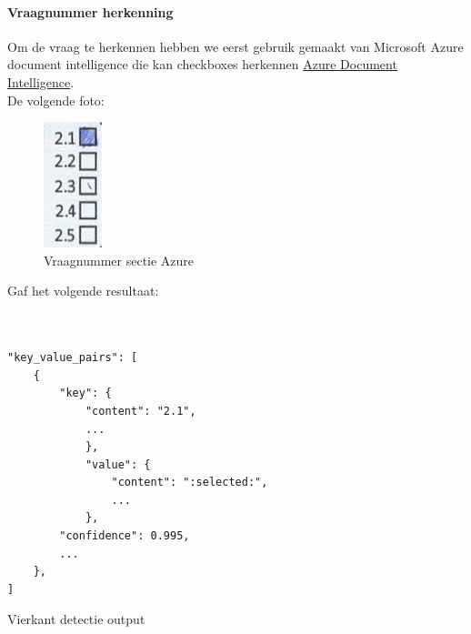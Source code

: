 \documentclass[12pt]{article}
\begin{document}
\begin{multicols}{2}
\paragraph*{Vraagnummer herkenning} Om de vraag te herkennen hebben we eerst gebruik gemaakt van Microsoft Azure document intelligence die kan checkboxes herkennen \href{https://azure.microsoft.com/en-us/products/ai-services/ai-document-intelligence}{Azure Document Intelligence}.\\
De volgende foto:
\begin{figure}[H]
    \centering
    \includegraphics[width=0.2\linewidth]{./images/methoden/inscannen/sectie/checkbox/vraagnummer/answer_section.png}
    \caption{Vraagnummer sectie Azure}
    \label{fig:sec-azure}
\end{figure}
\noindent Gaf het volgende resultaat: 
\begin{listing}[H]
\begin{verbatim}


"key_value_pairs": [
    {
        "key": {
            "content": "2.1",
            ...
            },
            "value": {
                "content": ":selected:",
                ...
            },
        "confidence": 0.995,
        ...
    },
]

\end{verbatim}
\caption{Vierkant detectie output} 
\label{json-example}
\end{listing}


\end{multicols}
\end{document}
